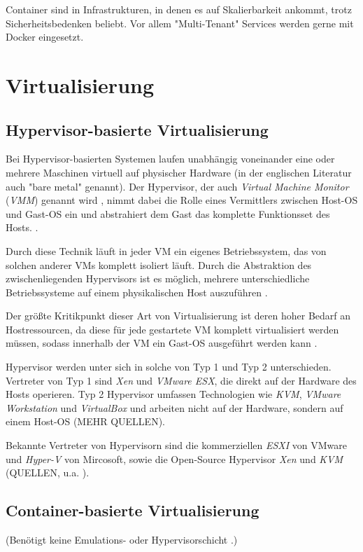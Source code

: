 \documentclass[../main.tex]{subfiles}
\begin{document}
  Container sind in Infrastrukturen, in denen es auf Skalierbarkeit ankommt, trotz Sicherheitsbedenken beliebt. Vor allem "Multi-Tenant" Services werden gerne mit Docker eingesetzt.

	\section{Virtualisierung}
    \subsection{Hypervisor-basierte Virtualisierung}
      Bei Hypervisor-basierten Systemen laufen unabhängig voneinander eine oder mehrere Maschinen virtuell auf physischer Hardware (in der englischen Literatur auch "bare metal" genannt). Der Hypervisor, der auch \emph{Virtual Machine Monitor} (\emph{VMM}) genannt wird \cite[S.2]{containerVirtPerformance}, nimmt dabei die Rolle eines Vermittlers zwischen Host-OS und Gast-OS ein \cite[S.6]{dockerBook} und abstrahiert dem Gast das komplette Funktionsset des Hosts. \cite[S.2]{dockerSec1}.

      Durch diese Technik läuft in jeder VM ein eigenes Betriebssystem, das von solchen anderer VMs komplett isoliert läuft. Durch die Abstraktion des zwischenliegenden Hypervisors ist es möglich, mehrere unterschiedliche Betriebssysteme auf einem physikalischen Host auszuführen \cite[S.2]{containerVirtPerformance}.

      Der größte Kritikpunkt dieser Art von Virtualisierung ist deren hoher Bedarf an Hostressourcen, da diese für jede gestartete VM komplett virtualisiert werden müssen, sodass innerhalb der VM ein Gast-OS ausgeführt werden kann \cite[S.1]{dockerIntroIEEE}\cite[S.3]{dockerLXCKub}.

      Hypervisor werden unter sich in solche von Typ 1 und Typ 2 unterschieden. Vertreter von Typ 1 sind \emph{Xen} und \emph{VMware ESX}, die direkt auf der Hardware des Hosts operieren.
      Typ 2 Hypervisor umfassen Technologien wie \emph{KVM}, \emph{VMware Workstation} und \emph{VirtualBox} und arbeiten nicht auf der Hardware, sondern auf einem Host-OS \cite[S.2]{dockerSec1} (MEHR QUELLEN).

      Bekannte Vertreter von Hypervisorn sind die kommerziellen \emph{ESXI} von VMware und \emph{Hyper-V} von Mircosoft, sowie die Open-Source Hypervisor \emph{Xen} und \emph{KVM} (QUELLEN, u.a. \cite[S.1]{dockerLXCKub}).

    \subsection{Container-basierte Virtualisierung}
      (Benötigt keine Emulations- oder Hypervisorschicht \cite[S.7]{dockerBook}.)
\end{document}

